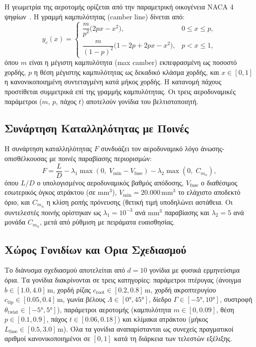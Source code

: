 Η γεωμετρία της αεροτομής ορίζεται από την παραμετρική οικογένεια NACA 4 ψηφίων~\cite{abbott1959theory}. Η γραμμή καμπυλότητας (camber line) δίνεται από:
\begin{equation}
\label{eq:naca_camber}
y_c(x) =
\begin{cases}
\dfrac{m}{p^2}\bigl(2p x - x^2\bigr), & 0 \le x \le p, \\[6pt]
\dfrac{m}{(1-p)^2}\bigl(1 - 2p + 2p x - x^2\bigr), & p < x \le 1,
\end{cases}
\end{equation}
όπου $m$ είναι η μέγιστη καμπυλότητα (max camber) εκπεφρασμένη ως ποσοστό χορδής, $p$ η θέση μέγιστης καμπυλότητας ως δεκαδικό κλάσμα χορδής, και $x \in [0,1]$ η κανονικοποιημένη συντεταγμένη κατά μήκος χορδής. Η κατανομή πάχους προστίθεται συμμετρικά επί της γραμμής καμπυλότητας. Οι τρεις αεροδυναμικές παράμετροι ($m$, $p$, πάχος $t$) αποτελούν γονίδια του βελτιστοποιητή.

\subsection{Συνάρτηση Καταλληλότητας με Ποινές}
\label{subsec:impl_fitness}

Η συνάρτηση καταλληλότητας $F$ συνδυάζει τον αεροδυναμικό λόγο άνωσης-οπισθέλκουσας με ποινές παραβίασης περιορισμών:
\begin{equation}
\label{eq:fitness}
F = \frac{L}{D} - \lambda_1 \max\!\left(0,\; V_{\min} - V_{\text{fuse}}\right) - \lambda_2 \max\!\left(0,\; C_{m_\alpha}\right),
\end{equation}
όπου $L/D$ ο υπολογισμένος αεροδυναμικός βαθμός απόδοσης, $V_{\text{fuse}}$ ο διαθέσιμος εσωτερικός όγκος ατράκτου (σε mm$^3$), $V_{\min} = 20{.}000\,\text{mm}^3$ το ελάχιστο αποδεκτό όριο, και $C_{m_\alpha}$ η κλίση ροπής πρόνευσης (θετική τιμή υποδηλώνει αστάθεια. Οι συντελεστές ποινής ορίστηκαν ως $\lambda_1 = 10^{-3}$ ανά mm$^3$ παραβίασης και $\lambda_2 = 5$ ανά μονάδα $C_{m_\alpha}$, μετά από ρύθμιση με πειράματα ευαισθησίας.

\subsection{Χώρος Γονιδίων και Όρια Σχεδιασμού}
\label{subsec:impl_gene_bounds}

Το διάνυσμα σχεδιασμού αποτελείται από $d = 10$ γονίδια με φυσικά ερμηνεύσιμα όρια. Τα γονίδια διακρίνονται σε τρεις κατηγορίες: παράμετροι πτέρυγας (άνοιγμα $b \in [1.0, 4.0]$\,m, χορδή ρίζας $c_{\text{root}} \in [0.2, 0.8]$\,m, χορδή ακροπτερυγίου $c_{\text{tip}} \in [0.05, 0.4]$\,m, γωνία βέλους $\Lambda \in [0°, 45°]$, δίεδρο $\Gamma \in [-5°, 10°]$, συστροφή $\theta_{\text{twist}} \in [-5°, 5°]$), παράμετροι αεροτομής (καμπυλότητα $m \in [0, 0.09]$, θέση $p \in [0.1, 0.9]$, πάχος $t \in [0.06, 0.18]$) και κλίμακα ατράκτου (μήκος $L_{\text{fuse}} \in [0.5, 3.0]$\,m). Όλα τα γονίδια αναπαρίστανται ως συνεχείς πραγματικοί αριθμοί κανονικοποιημένοι σε $[0,1]$ κατά τη διάρκεια των τελεστών εξέλιξης.

